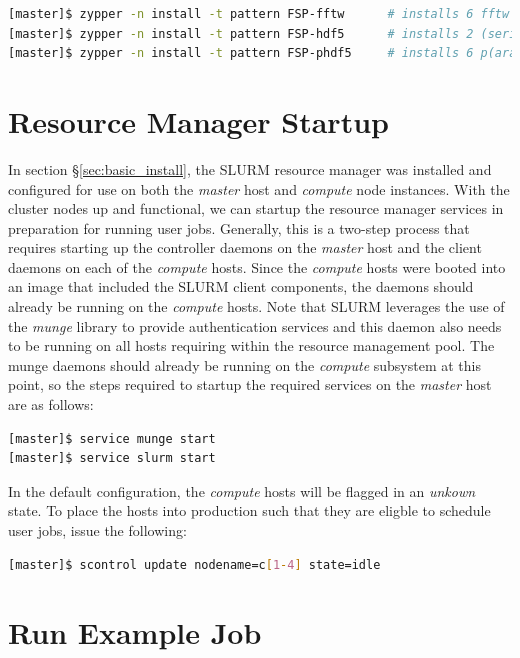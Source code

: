 \documentclass[letterpaper]{article}
\begin{document}
\begin{lstlisting}[language=bash]
[master]$ zypper -n install -t pattern FSP-fftw      # installs 6 fftw packages
[master]$ zypper -n install -t pattern FSP-hdf5      # installs 2 (serial) hdf5 packages
[master]$ zypper -n install -t pattern FSP-phdf5     # installs 6 p(arallel) hdf5 packages
\end{lstlisting}

\section{Resource Manager Startup}

In section \S\ref{sec:basic_install}, the SLURM resource manager was installed
and configured for use on both the {\em master} host and {\em compute} node
instances. With the cluster nodes up and functional, we can startup the
resource manager services in preparation for running user jobs. Generally, this
is a two-step process that requires starting up the controller daemons on the {\em
  master} host and the client daemons on each of the {\em compute} hosts.  Since the
{\em compute} hosts were booted into an image that included the SLURM client
components, the daemons should already be running on the {\em compute}
hosts. Note that SLURM leverages the use of the {\em munge} library to provide
authentication services and this daemon also needs to be running on all hosts
requiring within the resource management pool. The munge daemons should already
be running on the {\em compute} subsystem at this point, so the steps required
to startup the required services on the {\em master} host are as follows: 

\begin{lstlisting}[language=bash]
[master]$ service munge start
[master]$ service slurm start
\end{lstlisting}

In the default configuration, the {\em compute} hosts will be flagged in an
{\em unkown} state. To place the hosts into production such that they are
eligble to schedule user jobs, issue the following:

\begin{lstlisting}[language=bash]
[master]$ scontrol update nodename=c[1-4] state=idle
\end{lstlisting}


\section{Run Example Job}
\end{document}
